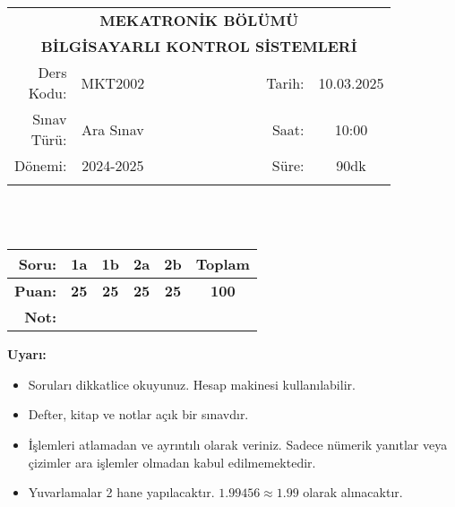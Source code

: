 \newcommand\UniversiteAdi{Niğde Ömer Halisdemir Üniversitesi}
\newcommand\BolumAdi{MEKATRONİK BÖLÜMÜ}
\newcommand\DersKodu{MKT2002}
\newcommand\DersAdi{BİLGİSAYARLI KONTROL SİSTEMLERİ}
\newcommand\SinavAdi{Ara Sınav}
\newcommand\SinavTarihi{10.03.2025}
\newcommand\SinavSaati{10:00}
\newcommand\SinavSuresi{90dk}

\pagestyle{fancy}
\fancyhf{} %
\noindent
\begin{tabular}{
    p{0.15\linewidth}
    p{0.15\linewidth}
    p{0.3\linewidth}
    p{0.1\linewidth}
    p{0.15\linewidth}}
    \multicolumn{5}{c}{\textbf{\BolumAdi}}\\
    \multicolumn{5}{c}{\textbf{\DersAdi}}\\\hline
    \multicolumn{1}{|r|}{Ders Kodu:}&
    \multicolumn{1}{|c|}{\DersKodu}&
    \multicolumn{1}{|c|}{}& 
    \multicolumn{1}{|r|}{Tarih:}&
    \multicolumn{1}{|c|}{\SinavTarihi} \\\hline
    \multicolumn{1}{|r|}{Sınav Türü:}&
    \multicolumn{1}{|c|}{\SinavAdi}&  
    \multicolumn{1}{|c|}{}&
    \multicolumn{1}{|r|}{Saat:}&
    \multicolumn{1}{|c|}{\SinavSaati}\\\hline
    \multicolumn{1}{|r|}{Dönemi:}&
    \multicolumn{1}{|c|}{2024-2025}&
    \multicolumn{1}{|c|}{}&
    \multicolumn{1}{|r|}{Süre:}&
    \multicolumn{1}{|c|}{\SinavSuresi} \\\hline
    &&&&\\
\end{tabular}\\\\
\noindent\begin{center}
\begin{tabular}{|r|c|c|c|c|c|}\hline
    \textbf{Soru:}&
    \textbf{1a}&
    \textbf{1b}&
    \textbf{2a}&
    \textbf{2b}&
    \textbf{Toplam}\\\hline
    \textbf{Puan:}&
    \textbf{25}&
    \textbf{25}&
    \textbf{25}&
    \textbf{25}&
    \textbf{100}\\\hline
    \textbf{Not:}&&&&&\\\hline
\end{tabular}\end{center}
\noindent\textbf{Uyarı:}
\begin{itemize}\bfseries
    \item Soruları dikkatlice okuyunuz. Hesap makinesi kullanılabilir.
    \item Defter, kitap ve notlar açık bir sınavdır.
    \item İşlemleri atlamadan ve ayrıntılı olarak veriniz. Sadece nümerik yanıtlar veya çizimler ara işlemler olmadan kabul edilmemektedir.
    \item Yuvarlamalar 2 hane yapılacaktır. $\mathbf{1.99456\approx1.99}$ olarak alınacaktır.
\end{itemize}

